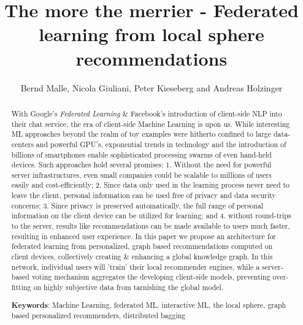 \documentclass{llncs}
\begin{document}
\title{The more the merrier - Federated learning from local sphere recommendations}

\author{Bernd Malle, Nicola Giuliani, Peter Kieseberg and Andreas Holzinger}

	
\maketitle

\begin{abstract}
	
With Google's \textit{Federated Learning} \& Facebook's introduction of client-side NLP into their chat service, the era of client-side Machine Learning is upon us. While interesting ML approaches beyond the realm of toy examples were hitherto confined to large data-centers and powerful GPU's, exponential trends in technology and the introduction of billions of smartphones enable sophisticated processing swarms of even hand-held devices. Such approaches hold several promises: 1. Without the need for powerful server infrastructures, even small companies could be scalable to millions of users easily and cost-efficiently; 2. Since data only used in the learning process never need to leave the client, personal information can be used free of privacy and data security concerns; 3. Since privacy is preserved automatically, the full range of personal information on the client device can be utilized for learning; and 4. without round-trips to the server, results like recommendations can be made available to users much faster, resulting in enhanced user experience. In this paper we propose an architecture for federated learning from personalized, graph based recommendations computed on client devices, collectively creating \& enhancing a global knowledge graph. In this network, individual users will 'train' their local recommender engines, while a server-based voting mechanism aggregates the developing client-side models, preventing over-fitting on highly subjective data from tarnishing the global model.

\medskip

\textbf{Keywords}: Machine Learning, federated ML, interactive ML, the local sphere, graph based personalized recommenders, distributed bagging


\end{abstract}
\end{document}
